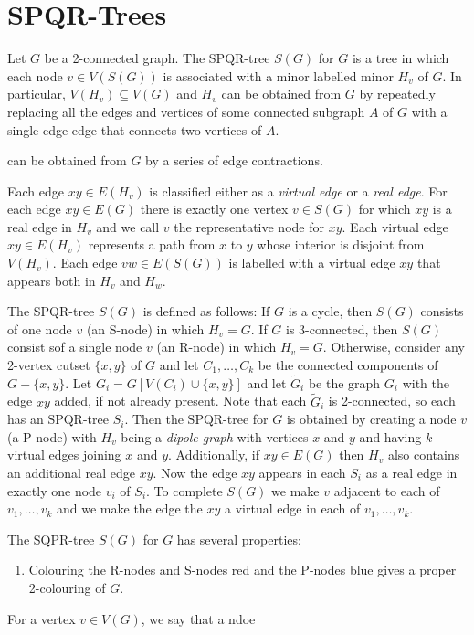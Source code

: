 \documentclass{patmorin}
\begin{document}
\section{SPQR-Trees}

Let $G$ be a 2-connected graph. The SPQR-tree $S(G)$ for $G$ is a tree
in which each node $v\in V(S(G))$ is associated with a minor labelled
minor $H_v$ of $G$.  In particular, $V(H_v)\subseteq V(G)$ and $H_v$ can
be obtained from $G$ by repeatedly replacing all the edges and vertices of some connected subgraph $A$ of $G$ with a single edge edge that connects two vertices of $A$.



can be obtained from $G$
by a series of edge contractions.

Each edge $xy\in E(H_v)$ is classified either as a \emph{virtual
edge} or a \emph{real edge}.  For each edge $xy\in E(G)$ there is exactly
one vertex $v\in S(G)$ for which $xy$ is a real edge in $H_v$ and we
call $v$ the representative node for $xy$.  Each virtual edge $xy\in
E(H_v)$ represents a path from $x$ to $y$ whose interior is disjoint
from $V(H_v)$.  Each edge $vw\in E(S(G))$ is labelled with a virtual edge
$xy$ that appears both in $H_v$ and $H_w$.

The SPQR-tree $S(G)$ is defined as follows:  If $G$ is a cycle, then
$S(G)$ consists of one node $v$ (an S-node) in which $H_v=G$.  If $G$
is 3-connected, then $S(G)$ consist sof a single node $v$ (an R-node) in
which $H_v=G$.  Otherwise, consider any 2-vertex cutset $\{x,y\}$ of $G$
and let $C_1,\ldots,C_k$ be the connected components of $G-\{x,y\}$.
Let $G_i=G[V(C_i)\cup\{x,y\}]$ and let $\tilde{G}_i$ be the graph
$G_i$ with the edge $xy$ added, if not already present. Note that each
$\tilde{G}_i$ is 2-connected, so each has an SPQR-tree $S_i$.  Then the
SPQR-tree for $G$ is obtained by creating a node $v$ (a P-node) with
$H_v$ being a \emph{dipole graph} with vertices $x$ and $y$ and having
$k$ virtual edges joining $x$ and $y$.  Additionally, if $xy\in E(G)$
then $H_v$ also contains an additional real edge $xy$.  Now the edge $xy$
appears in each $S_i$ as a real edge in exactly one node $v_i$ of $S_i$.
To complete $S(G)$ we make $v$ adjacent to each of $v_1,\ldots,v_k$
and we make the edge the $xy$ a virtual edge in each of $v_1,\ldots,v_k$.

The SQPR-tree $S(G)$ for $G$ has several properties:

\begin{enumerate}
   \item Colouring the R-nodes and S-nodes red and the P-nodes blue gives a proper 2-colouring of $G$.
\end{enumerate}

For a vertex $v\in V(G)$, we say that a ndoe
\end{document}
